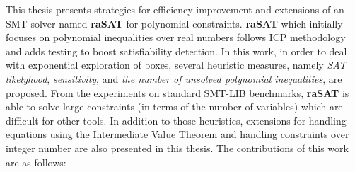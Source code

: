 This thesis presents strategies for efficiency improvement and extensions of an SMT solver named {\bf raSAT} for polynomial constraints. {\bf raSAT} which initially focuses on polynomial inequalities over real numbers follows ICP methodology and adds testing to boost satisfiability detection. In this work, in order to deal with exponential exploration of boxes, several heuristic measures, namely {\em SAT likelyhood}, {\em sensitivity}, and \emph{the number of 
unsolved polynomial inequalities}, are proposed. From the experiments on standard SMT-LIB benchmarks, \textbf{raSAT} is able to solve large constraints (in terms of the number of variables) which are difficult for other tools. 
In addition to those heuristics, extensions for handling equations using the Intermediate Value Theorem and handling constraints over integer number are also presented in this thesis.
The contributions of this work are as follows:
